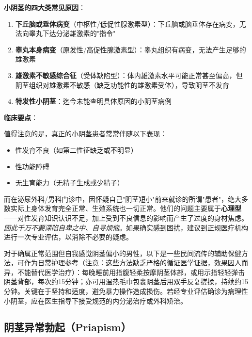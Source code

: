 \vspace{0.5em}
\noindent\textbf{小阴茎的四大类常见原因}：

\begin{enumerate}
	\item \textbf{下丘脑或垂体病变}（中枢性/低促性腺激素型）：下丘脑或脑垂体存在病变，无法向睾丸下达分泌雄激素的"指令"
	\item \textbf{睾丸本身病变}（原发性/高促性腺激素型）：睾丸组织有病变，无法产生足够的雄激素
	\item \textbf{雄激素不敏感综合征}（受体缺陷型）：体内雄激素水平可能正常甚至偏高，但阴茎组织对雄激素不敏感（缺乏功能性的雄激素受体），导致阴茎不发育
	\item \textbf{特发性小阴茎}：迄今未能查明具体原因的小阴茎病例
\end{enumerate}

\vspace{0.5em}
\noindent\textbf{临床要点}：

值得注意的是，真正的小阴茎患者常常伴随以下表现：
\begin{itemize}
	\item 性发育不良（如第二性征缺乏或不明显）
	\item 性功能障碍
	\item 无生育能力（无精子生成或少精子）
\end{itemize}

而在泌尿外科/男科门诊中，因怀疑自己"阴茎短小"前来就诊的所谓"患者"，绝大多数实际上身体发育完全正常、生殖系统也一切正常。他们的问题主要属于\textbf{心理型}——对性发育知识认识不足，加上受到不良信息的影响而产生了过度的身材焦虑。\textit{因此千万不要深陷自卑之中、自寻烦恼}。如果确实感到困扰，建议到正规医疗机构进行一次专业评估，以消除不必要的疑虑。

\begin{tcolorbox}[colback=pink!5!white,colframe=red!50!black,title=贴心小叮咛]
对于确属正常范围但自我感觉阴茎偏小的男性，以下是一些民间流传的辅助保健方法，可作为日常护理参考（注意：这些方法缺乏严格的循证医学证据，效果因人而异，不能替代医学治疗）：每晚睡前用指腹轻柔按摩阴茎体部，或用示指轻轻弹击阴茎背部，每次约15分钟；亦可用温热毛巾包裹阴茎后用双手反复搓揉，持续约15分钟。关键在于坚持和适度，避免暴力操作造成损伤。若经专业评估确诊为病理性小阴茎，应在医生指导下接受规范的内分泌治疗或外科矫治。
\end{tcolorbox}

\subsection{阴茎异常勃起（Priapism）}

